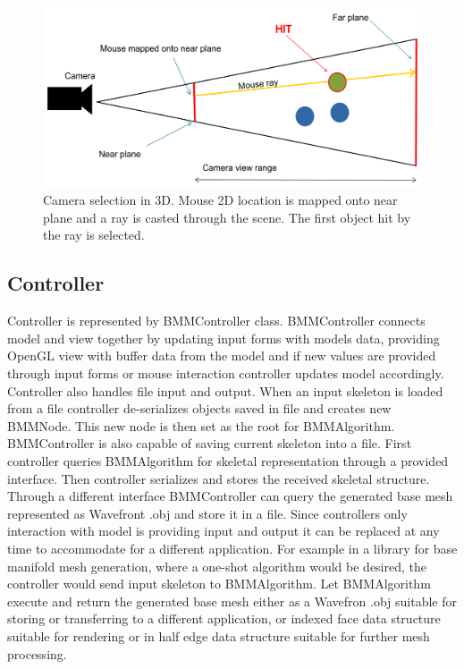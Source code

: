 \begin{figure}[h]
    \centering
    \includegraphics[width=\textwidth]{images/camera_selection}
    \caption[Camera selection]{Camera selection in 3D. Mouse 2D location is mapped onto near plane and a ray is casted through the scene. The first object hit by the ray is selected.}
    \label{fig:camera_selection}
\end{figure}

\subsection{Controller}

Controller is represented by BMMController class.
BMMController connects model and view together by updating input forms with models data, providing OpenGL view with buffer data from the model and if new values are provided through input forms or mouse interaction controller updates model accordingly.
Controller also handles file input and output.
When an input skeleton is loaded from a file controller de-serializes objects saved in file and creates new BMMNode.
This new node is then set as the root for BMMAlgorithm.
BMMController is also capable of saving current skeleton into a file.
First controller queries BMMAlgorithm for skeletal representation through a provided interface.
Then controller serializes and stores the received skeletal structure.
Through a different interface BMMController can query the generated base mesh represented as Wavefront .obj and store it in a file.
Since controllers only interaction with model is providing input and output it can be replaced at any time to accommodate for a different application.
For example in a library for base manifold mesh generation, where a one-shot algorithm would be desired, the controller would  send input skeleton to BMMAlgorithm.
Let BMMAlgorithm execute and return the generated base mesh either as a Wavefron .obj suitable for storing or transferring to a different application, or indexed face data structure suitable for rendering or in half edge data structure suitable for further mesh processing.

